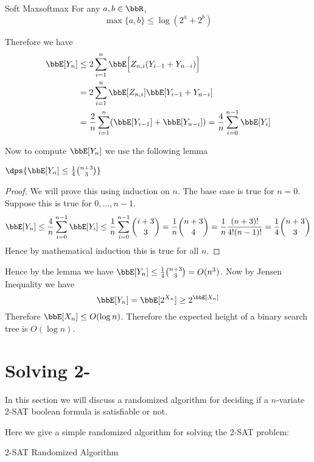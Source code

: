 \begin{lemma}{Soft Max}{softmax}
	For any $a,b\in \bbR$, $$\max\{a,b\}\leq \log (2^a+2^b)$$
\end{lemma}


Therefore we have \begin{align*}
	\bbE[Y_n] & \leq 2\sum\limits_{i=1}^n\bbE\Big[Z_{n,i}(Y_{i-1}+ Y_{n-i})\Big]\\
	& = 2\sum\limits_{i=1}^n\bbE[Z_{n,i}]\bbE[Y_{i-1}+ Y_{n-i}]\\
	& = \frac2n\sum_{i=1}^n (\bbE[Y_{i-1}]+\bbE[Y_{n-i}])=\frac4n\sum_{i=0}^{n-1}\bbE[Y_i]
\end{align*}

Now to compute $\bbE[Y_n]$ we use the following lemma
\begin{lemma}{}{}
	$\dps{\bbE[Y_n]\leq\frac14\binom{n+3}{3}}$
\end{lemma}
\begin{proof}
	We will prove this using induction on $n$. The base case is true for $n=0$. Suppose this is true for $0,\dots, n-1$. $$	\bbE[Y_n]\leq \frac4n\sum_{i=0}^{n-1}\bbE[Y_i]\leq \frac1n\sum_{i=0}^{n-1}\binom{i+3}{3}= \frac1n\binom{n+3}{4}= \frac1n\frac{(n+3)!}{4!(n-1)!}= \frac14\binom{n+3}{3}$$Hence by  mathematical induction  this is true for all $n$. 
\end{proof}

Hence by the lemma we have $\bbE[Y_n]\leq\frac14\binom{n+3}{3}=O(n^3)$. Now by Jensen Inequality we have $$\bbE[Y_n]=\bbE[2^{X_n}]\geq 2^{\bbE[X_n]}$$Therefore $\bbE[X_n]\leq O(\log n)$. Therefore the expected height of a binary search tree is $O(\log n)$. 
\section{Solving 2-}
In this section we will discuss a randomized algorithm for deciding if a $n$-variate 2-SAT boolean formula is satisfiable or not.

\begin{algoprob}
\end{algoprob}\parinf

Here we give a simple randomized algorithm for solving the 2-SAT problem:\parinn\newpage

\begin{algorithm}
\DontPrintSemicolon
{}
\caption{2-SAT Randomized Algorithm}
\end{algorithm}

